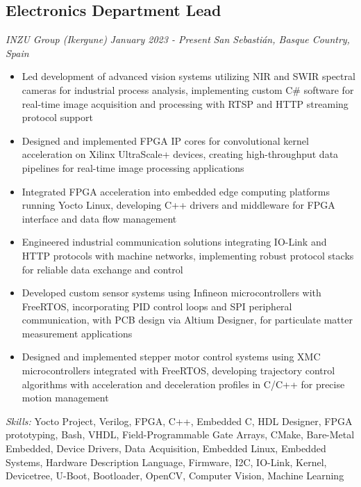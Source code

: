 \documentclass[11pt,a4paper]{article}
\begin{document}
\subsection{Electronics Department Lead}
\textit{INZU Group (Ikergune)} \hfill \textit{January 2023 - Present}
\textit{San Sebastián, Basque Country, Spain}
\begin{itemize}
    \item Led development of advanced vision systems utilizing NIR and SWIR spectral cameras for industrial process analysis, implementing custom C\# software for real-time image acquisition and processing with RTSP and HTTP streaming protocol support
    \item Designed and implemented FPGA IP cores for convolutional kernel acceleration on Xilinx UltraScale+ devices, creating high-throughput data pipelines for real-time image processing applications
    \item Integrated FPGA acceleration into embedded edge computing platforms running Yocto Linux, developing C++ drivers and middleware for FPGA interface and data flow management
    \item Engineered industrial communication solutions integrating IO-Link and HTTP protocols with machine networks, implementing robust protocol stacks for reliable data exchange and control
    \item Developed custom sensor systems using Infineon microcontrollers with FreeRTOS, incorporating PID control loops and SPI peripheral communication, with PCB design via Altium Designer, for particulate matter measurement applications
    \item Designed and implemented stepper motor control systems using XMC microcontrollers integrated with FreeRTOS, developing trajectory control algorithms with acceleration and deceleration profiles in C/C++ for precise motion management
\end{itemize}
\textit{Skills:} Yocto Project, Verilog, FPGA, C++, Embedded C, HDL Designer, FPGA prototyping, Bash, VHDL, Field-Programmable Gate Arrays, CMake, Bare-Metal Embedded, Device Drivers, Data Acquisition, Embedded Linux, Embedded Systems, Hardware Description Language, Firmware, I2C, IO-Link, Kernel, Devicetree, U-Boot, Bootloader, OpenCV, Computer Vision, Machine Learning
\end{document}
